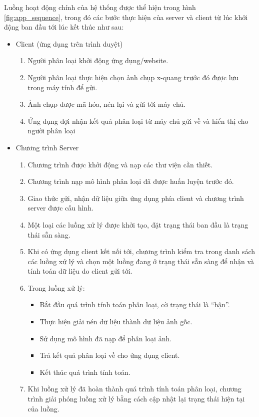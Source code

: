Luồng hoạt động chính của hệ thống được thể hiện trong hình \ref{fig:app_sequence}, trong đó các bước thực hiện của server và client từ lúc khởi động ban đầu tới lúc kết thúc như sau:
\begin{itemize}
	\item Client (ứng dụng trên trình duyệt)
		\begin{enumerate}
			\item Người phân loại khởi động ứng dụng/website.
			\item Người phân loại thực hiện chọn ảnh chụp x-quang trước đó được lưu trong máy tính để gửi.
			\item Ảnh chụp được mã hóa, nén lại và gửi tới máy chủ.
			\item Ứng dụng đợi nhận kết quả phân loại từ máy chủ gửi về và hiển thị cho người phân loại
		\end{enumerate}
	\item Chương trình Server
		\begin{enumerate}
			\item Chương trình được khởi động và nạp các thư viện cần thiết.
			\item Chương trình nạp mô hình phân loại đã được huấn luyện trước đó.
			\item Giao thức gửi, nhận dữ liệu giữa ứng dụng phía client và chương trình server được cấu hình.
			\item Một loại các luồng xử lý được khởi tạo, đặt trạng thái ban đầu là trạng thái sẵn sàng.
			\item Khi có ứng dụng client kết nối tới, chương trình kiểm tra trong danh sách các luồng xử lý và chọn một luồng đang ở trạng thái sẵn sàng để nhận và tính toán dữ liệu do client gửi tới.
			\item Trong luồng xử lý:
				\begin{itemize}
					\item Bắt đầu quá trình tính toán phân loại, cờ trạng thái là “bận”.
					\item Thực hiện giải nén dữ liệu thành dữ liệu ảnh gốc.
					\item Sử dụng mô hình đã nạp để phân loại ảnh.
					\item Trả kết quả phân loại về cho ứng dụng client.
					\item Kết thúc quá trình tính toán.
				\end{itemize}
			\item Khi luồng xử lý đã hoàn thành quá trình tính toán phân loại, chương trình giải phóng luồng xử lý bằng cách cập nhật lại trạng thái hiện tại của luồng.
		\end{enumerate}
\end{itemize}
